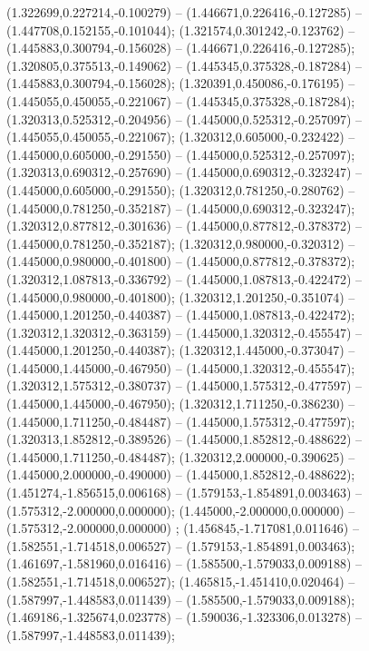  (1.322699,0.227214,-0.100279) -- (1.446671,0.226416,-0.127285) -- (1.447708,0.152155,-0.101044);
 (1.321574,0.301242,-0.123762) -- (1.445883,0.300794,-0.156028) -- (1.446671,0.226416,-0.127285);
 (1.320805,0.375513,-0.149062) -- (1.445345,0.375328,-0.187284) -- (1.445883,0.300794,-0.156028);
 (1.320391,0.450086,-0.176195) -- (1.445055,0.450055,-0.221067) -- (1.445345,0.375328,-0.187284);
 (1.320313,0.525312,-0.204956) -- (1.445000,0.525312,-0.257097) -- (1.445055,0.450055,-0.221067);
 (1.320312,0.605000,-0.232422) -- (1.445000,0.605000,-0.291550) -- (1.445000,0.525312,-0.257097);
 (1.320313,0.690312,-0.257690) -- (1.445000,0.690312,-0.323247) -- (1.445000,0.605000,-0.291550);
 (1.320312,0.781250,-0.280762) -- (1.445000,0.781250,-0.352187) -- (1.445000,0.690312,-0.323247);
 (1.320312,0.877812,-0.301636) -- (1.445000,0.877812,-0.378372) -- (1.445000,0.781250,-0.352187);
 (1.320312,0.980000,-0.320312) -- (1.445000,0.980000,-0.401800) -- (1.445000,0.877812,-0.378372);
 (1.320312,1.087813,-0.336792) -- (1.445000,1.087813,-0.422472) -- (1.445000,0.980000,-0.401800);
 (1.320312,1.201250,-0.351074) -- (1.445000,1.201250,-0.440387) -- (1.445000,1.087813,-0.422472);
 (1.320312,1.320312,-0.363159) -- (1.445000,1.320312,-0.455547) -- (1.445000,1.201250,-0.440387);
 (1.320312,1.445000,-0.373047) -- (1.445000,1.445000,-0.467950) -- (1.445000,1.320312,-0.455547);
 (1.320312,1.575312,-0.380737) -- (1.445000,1.575312,-0.477597) -- (1.445000,1.445000,-0.467950);
 (1.320312,1.711250,-0.386230) -- (1.445000,1.711250,-0.484487) -- (1.445000,1.575312,-0.477597);
 (1.320313,1.852812,-0.389526) -- (1.445000,1.852812,-0.488622) -- (1.445000,1.711250,-0.484487);
 (1.320312,2.000000,-0.390625) -- (1.445000,2.000000,-0.490000) -- (1.445000,1.852812,-0.488622);
 (1.451274,-1.856515,0.006168) -- (1.579153,-1.854891,0.003463) -- (1.575312,-2.000000,0.000000);
 (1.445000,-2.000000,0.000000) -- (1.575312,-2.000000,0.000000) ;
 (1.456845,-1.717081,0.011646) -- (1.582551,-1.714518,0.006527) -- (1.579153,-1.854891,0.003463);
 (1.461697,-1.581960,0.016416) -- (1.585500,-1.579033,0.009188) -- (1.582551,-1.714518,0.006527);
 (1.465815,-1.451410,0.020464) -- (1.587997,-1.448583,0.011439) -- (1.585500,-1.579033,0.009188);
 (1.469186,-1.325674,0.023778) -- (1.590036,-1.323306,0.013278) -- (1.587997,-1.448583,0.011439);
